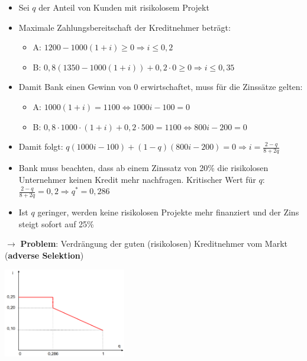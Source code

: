 \begin{itemize}
	\item Sei $q$ der Anteil von Kunden mit risikolosem Projekt
	\item Maximale Zahlungsbereitschaft der Kreditnehmer beträgt:
	\begin{itemize}
		\item A: $1200-1000(1+i)\geq 0 \Rightarrow i\leq 0,2$
		\item B: $0,8(1350-1000(1+i))+0,2\cdot0\geq 0 \Rightarrow i\leq 0,35$
	\end{itemize}
	\item Damit Bank einen Gewinn von 0 erwirtschaftet, muss für die Zinssätze gelten:
	\begin{itemize}
		\item A: $1000(1+i)=1100\Leftrightarrow 1000i-100=0$
		\item B: $0,8\cdot 1000\cdot (1+i)+0,2\cdot 500=1100\Leftrightarrow 800i-200=0$
	\end{itemize}
	\item Damit folgt: $q(1000i-100)+(1-q)(800i-200)=0\Rightarrow i=\frac{2-q}{8+2q}$
	\item Bank muss beachten, dass ab einem Zinssatz von 20\% die risikolosen Unternehmer keinen Kredit mehr nachfragen. Kritischer Wert für $q$:
	$\frac{2-q}{8+2q}=0,2\Rightarrow q^*=0,286$
	\item Ist $q$ geringer, werden keine risikolosen Projekte mehr finanziert und der Zins steigt sofort auf 25\%
\end{itemize}
$\rightarrow$ \textbf{Problem}: Verdrängung der guten (risikolosen) Kreditnehmer vom Markt (\textbf{adverse Selektion})
\begin{center}
	\includegraphics[width=0.4\textwidth]{images/as-2.png}
\end{center} 

